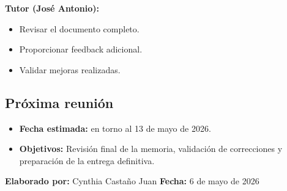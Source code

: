 \textbf{Tutor (José Antonio):}
\begin{itemize}
    \item Revisar el documento completo.
    \item Proporcionar feedback adicional.
    \item Validar mejoras realizadas.
\end{itemize}

\subsection*{Próxima reunión}
\begin{itemize}
    \item \textbf{Fecha estimada:} en torno al 13 de mayo de 2026.
    \item \textbf{Objetivos:} Revisión final de la memoria, validación de correcciones y preparación de la entrega definitiva.
\end{itemize}

\textbf{Elaborado por:} Cynthia Castaño Juan \hfill \textbf{Fecha:} 6 de mayo de 2026

